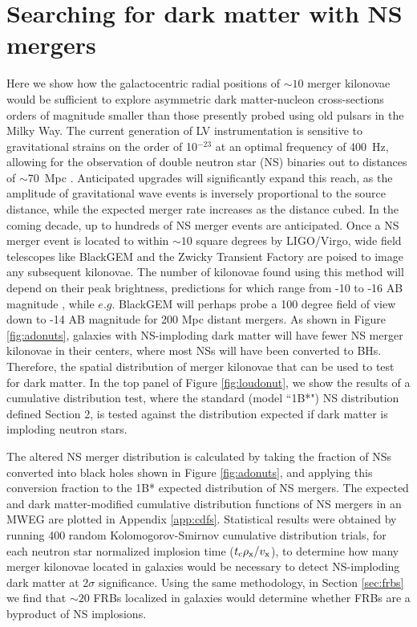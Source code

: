 \documentclass[nofootinbib,longbibliography,prd,floatfix,superscriptaddress,twocolumn]{revtex4-1}
\begin{document}
\section{Searching for dark matter with NS mergers}
\label{sec:dmsearch}
Here we show how the galactocentric radial positions of $\sim 10$ merger kilonovae would be sufficient to explore asymmetric dark matter-nucleon cross-sections orders of magnitude smaller than those presently probed using old pulsars in the Milky Way. The current generation of LV instrumentation is sensitive to gravitational strains on the order of 10$^{-23}$ at an optimal frequency of 400~Hz, allowing for the observation of double neutron star (NS) binaries out to distances of $\sim$70~Mpc \cite{Abbott:2016ymx}. Anticipated upgrades will significantly expand this reach, as the amplitude of gravitational wave events is inversely proportional to the source distance, while the expected merger rate increases as the distance cubed. In the coming decade, up to hundreds of NS merger events are anticipated. Once a NS merger event is located to within $\sim 10$ square degrees by LIGO/Virgo, wide field telescopes like BlackGEM \cite{Ghosh:2014yga} and the Zwicky Transient Factory \cite{2014htu..conf...27B} are poised to image any subsequent kilonovae. The number of kilonovae found using this method will depend on their peak brightness, predictions for which range from -10 to -16 AB magnitude \cite{Doctor:2016gdi}, while $e.g.$ BlackGEM will perhaps probe a 100 degree field of view down to -14 AB magnitude for 200 Mpc distant mergers. As shown in Figure \ref{fig:adonuts}, galaxies with NS-imploding dark matter will have fewer NS merger kilonovae in their centers, where most NSs will have been converted to BHs. Therefore, the spatial distribution of merger kilonovae that can be used to test for dark matter. In the top panel of Figure \ref{fig:loudonut}, we show the results of a cumulative distribution test, where the standard (model ``1B*") NS distribution defined Section 2, is tested against the distribution expected if dark matter is imploding neutron stars. 

The altered NS merger distribution is calculated by taking the fraction of NSs converted into black holes shown in Figure \ref{fig:adonuts}, and applying this conversion fraction to the 1B* expected distribution of NS mergers. The expected and dark matter-modified cumulative distribution functions of NS mergers in an MWEG are plotted in Appendix \ref{app:cdfs}. Statistical results were obtained by running 400 random Kolomogorov-Smirnov cumulative distribution trials, for each neutron star normalized implosion time ($t_{\rm c} \rho_{\rm x} /v_{\rm x}$), to determine how many merger kilonovae located in galaxies would be necessary to detect NS-imploding dark matter at 2$\sigma$ significance. Using the same methodology, in Section \ref{sec:frbs} we find that $\sim 20$ FRBs localized in galaxies would determine whether FRBs are a byproduct of NS implosions. 
\end{document}
